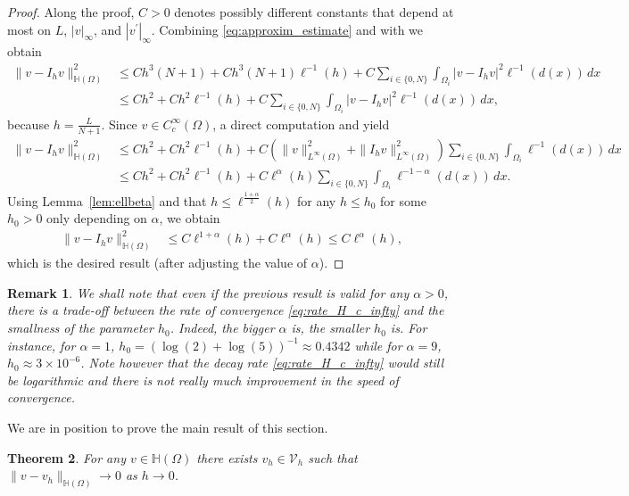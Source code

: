 \documentclass[11 pt]{article}
\newtheorem{theorem}{Theorem}[section]
\newtheorem{remark}[theorem]{Remark}
\numberwithin{equation}{section}
\begin{document}
\begin{proof}
Along the proof, $C>0$ denotes possibly different constants that depend at most on $L$, $|v|_{\infty}$, and $|v^\prime|_{\infty}$.  Combining \eqref{eq:approxim_estimate} and  with  we obtain
%
\begin{align*}
    \|v-I_h v\|^2_{\mathbb H(\Omega)}&\leq  C h^3(N+1)+Ch^3(N+1)\ell^{-1}(h)+C\sum_{i\in\{0,N\}}\int_{\Omega_i}|v-I_h v|^2\ell^{-1}(d(x))\,dx \\
    &\leq Ch^2+Ch^2\ell^{-1}(h)+C\sum_{i\in\{0,N\}}\int_{\Omega_i}|v-I_h v|^2\ell^{-1}(d(x))\,dx,
\end{align*}
because $h=\frac{L}{N+1}$. Since $v\in C_c^\infty(\Omega)$, a direct computation and  yield
%
\begin{align*}
    \|v-I_h v\|^2_{\mathbb H(\Omega)} &\leq Ch^2+Ch^2\ell^{-1}(h)+C\left(\|v\|_{L^\infty(\Omega)}^2+\|I_hv\|^2_{L^\infty(\Omega)}\right)\sum_{i\in\{0,N\}}\int_{\Omega_i}\ell^{-1}(d(x))\,dx \\
    & \leq Ch^2+Ch^2\ell^{-1}(h)+C\ell^{\alpha}(h)\sum_{i\in\{0,N\}}\int_{\Omega_i}\ell^{-1-\alpha}(d(x))\,dx.
\end{align*}
%
Using Lemma~\ref{lem:ellbeta} and that $h\leq \ell^{\frac{1+\alpha}{2}}(h)$ for any $h\leq h_0$ for some $h_0>0$ only depending on $\alpha$, we obtain
%
\begin{align*}
    \|v-I_h v\|^2_{\mathbb H(\Omega)}
    & \leq C\ell^{1+\alpha}(h)+C\ell^{\alpha}(h)\leq C \ell^{\alpha}(h),
\end{align*}
which is the desired result {(after adjusting the value of $\alpha$)}.
\end{proof}

\begin{remark}
We shall note that even if the previous result is valid for any $\alpha>0$, there is a trade-off between the rate of convergence \eqref{eq:rate_H_c_infty} and the smallness of the parameter $h_0$. Indeed, the bigger $\alpha$ is, the smaller $h_0$ is. For instance, for $\alpha=1$, $h_0=(\log(2)+\log(5))^{-1}\approx 0.4342$ while for $\alpha=9$, $h_0\approx 3\times 10^{-6}$. Note however that the decay rate \eqref{eq:rate_H_c_infty} would still be logarithmic and there is not really much improvement in the speed of convergence.  
\end{remark}

We are in position to prove the main result of this section.

\begin{theorem}\label{density:thm}
    For any $v\in\mathbb H(\Omega)$ there exists $v_h\in\mathcal V_h$ such that $\|v-v_h\|_{\mathbb H(\Omega)}\to 0$ as $h\to 0$. 
\end{theorem}
\end{document}
